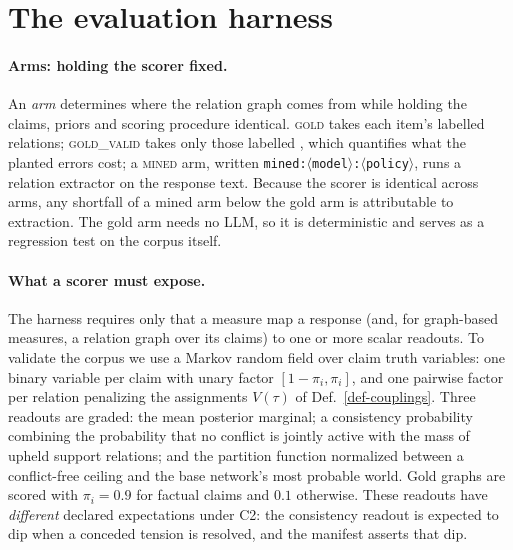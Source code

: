 \section{The evaluation harness}
\label{sec-harness}

\paragraph{Arms: holding the scorer fixed.} An \emph{arm} determines where the relation graph comes from while
holding the claims, priors and scoring procedure identical. \textsc{gold} takes each item's labelled relations;
\textsc{gold\_valid} takes only those labelled , which quantifies what the planted errors cost; a
\textsc{mined} arm, written \texttt{mined:$\langle$model$\rangle$:$\langle$policy$\rangle$}, runs a relation
extractor on the response text. Because the scorer is identical across arms, any shortfall of a mined arm
below the gold arm is attributable to extraction. The gold arm needs no LLM, so it is deterministic and
serves as a regression test on the corpus itself.

\paragraph{What a scorer must expose.} The harness requires only that a measure map a response (and, for
graph-based measures, a relation graph over its claims) to one or more scalar readouts. To validate the corpus
we use a Markov random field over claim truth variables: one binary variable per claim with unary factor
$[1-\pi_i,\pi_i]$, and one pairwise factor per relation penalizing the assignments $V(\tau)$ of
Def.~\ref{def-couplings}. Three readouts are graded: the mean posterior marginal; a consistency probability
combining the probability that no conflict is jointly active with the mass of upheld support relations; and
the partition function normalized between a conflict-free ceiling and the base network's most probable world.
Gold graphs are scored with $\pi_i=0.9$ for factual claims and $0.1$ otherwise. These readouts have
\emph{different} declared expectations under C2: the consistency readout is expected to dip when a conceded
tension is resolved, and the manifest asserts that dip.

